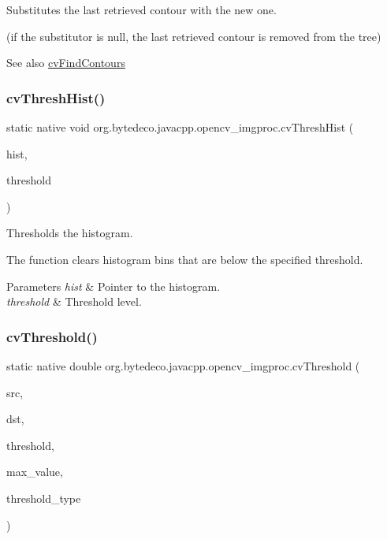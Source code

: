 Substitutes the last retrieved contour with the new one. 

(if the substitutor is null, the last retrieved contour is removed from the tree) \begin{DoxySeeAlso}{See also}
\hyperlink{group__imgproc__c_gaa4cfb26bdebe22cd9a83d79b429520ee}{cv\+Find\+Contours} 
\end{DoxySeeAlso}
\mbox{\label{group__imgproc__c_ga1c1fb991e209c208c788ade579aacc5a}} 
\subsubsection{\texorpdfstring{cv\+Thresh\+Hist()}{cvThreshHist()}}
{\footnotesize\ttfamily static native void org.\+bytedeco.\+javacpp.\+opencv\+\_\+imgproc.\+cv\+Thresh\+Hist (\begin{DoxyParamCaption}\item[{Cv\+Histogram}]{hist,  }\item[{double}]{threshold }\end{DoxyParamCaption})\hspace{0.3cm}{\ttfamily [static]}}



Thresholds the histogram. 

The function clears histogram bins that are below the specified threshold. 


\begin{DoxyParams}{Parameters}
{\em hist} & Pointer to the histogram. \\
\hline
{\em threshold} & Threshold level. \\
\hline
\end{DoxyParams}
\mbox{\label{group__imgproc__c_ga41525ded1f96706f6d9368df2a6f044a}} 
\subsubsection{\texorpdfstring{cv\+Threshold()}{cvThreshold()}}
{\footnotesize\ttfamily static native double org.\+bytedeco.\+javacpp.\+opencv\+\_\+imgproc.\+cv\+Threshold (\begin{DoxyParamCaption}\item[{@Const Cv\+Arr}]{src,  }\item[{Cv\+Arr}]{dst,  }\item[{double}]{threshold,  }\item[{double}]{max\+\_\+value,  }\item[{int}]{threshold\+\_\+type }\end{DoxyParamCaption})\hspace{0.3cm}{\ttfamily [static]}}



